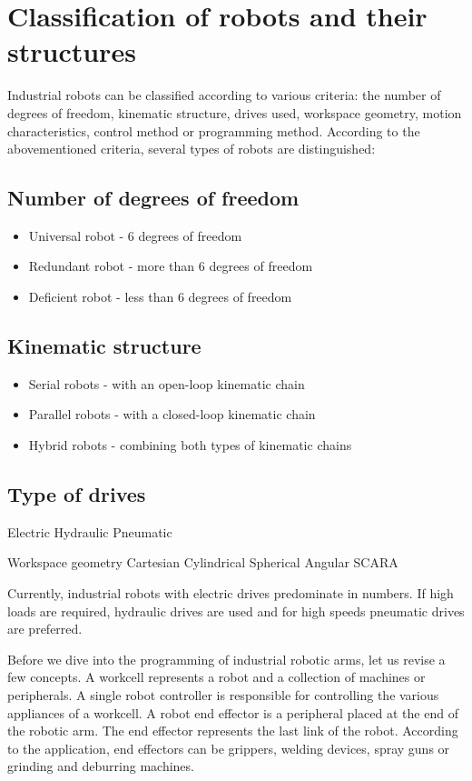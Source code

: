 
\section{Classification of robots and their structures}

Industrial robots can be classified according to various criteria: the number of degrees of freedom, kinematic structure, drives used, workspace geometry, motion characteristics, control method or programming method. According to the abovementioned criteria, several types of robots are distinguished:
\subsection{Number of degrees of freedom}

\begin{itemize}
    \item Universal robot - 6 degrees of freedom
    \item Redundant robot - more than 6 degrees of freedom
    \item Deficient robot - less than 6 degrees of freedom
\end{itemize}

\subsection{Kinematic structure}

\begin{itemize}
    \item Serial robots - with an open-loop kinematic chain
    \item Parallel robots - with a closed-loop kinematic chain
    \item Hybrid robots - combining both types of kinematic chains
\end{itemize}


\subsection{Type of drives}
Electric
Hydraulic
Pneumatic

Workspace geometry
Cartesian
Cylindrical
Spherical
Angular
SCARA


Currently, industrial robots with electric drives predominate in numbers. If
high loads are required, hydraulic drives are used and for high speeds pneumatic
drives are preferred.

Before we dive into the programming of industrial robotic arms, let us revise a few concepts.
A workcell represents a robot and a collection of machines or peripherals. A single robot controller is responsible for controlling the various appliances of a workcell.
A robot end effector is a peripheral placed at the end of the robotic arm. The end effector represents the last link of the robot. According to the application, end effectors can be grippers, welding devices, spray guns or grinding and deburring machines.

